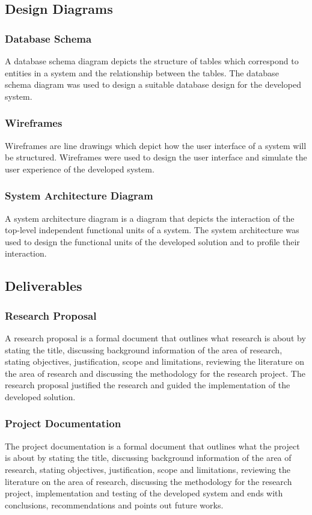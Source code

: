 \documentclass[12pt, a4paper]{article}
\begin{document}
\subsection{Design Diagrams}
\subsubsection{Database Schema}
A database schema diagram depicts the structure of tables which correspond to entities in a system and the relationship between the tables. The database schema diagram was used to design a suitable database design for the developed system.
\subsubsection{Wireframes}
Wireframes are line drawings which depict how the user interface of a system will be structured. Wireframes were used to design the user interface and simulate the user experience of the developed system.
\subsubsection{System Architecture Diagram}
A system architecture diagram is a diagram that depicts the interaction of the top-level independent functional units of a system. The system architecture was used to design the functional units of the developed solution and to profile their interaction.
\subsection{Deliverables}
\subsubsection{Research Proposal}
A research proposal is a formal document that outlines what research is about by stating the title, discussing background information of the area of research, stating objectives, justification, scope and limitations, reviewing the literature on the area of research and discussing the methodology for the research project. The research proposal justified the research and guided the implementation of the developed solution.
\subsubsection{Project Documentation}
The project documentation is a formal document that outlines what the project is about by stating the title, discussing background information of the area of research, stating objectives, justification, scope and limitations, reviewing the literature on the area of research, discussing the methodology for the research project, implementation and testing of the developed system and ends with conclusions, recommendations and points out future works.
\end{document}
